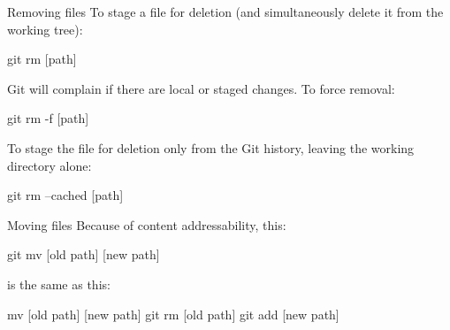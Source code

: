 \begin{frame}[fragile]{Removing files}
  To stage a file for deletion (and simultaneously delete it from the
  working tree):

  \begin{gitCommand}git rm [path]\end{gitCommand}

  Git will complain if there are local or staged changes. To force removal:

  \begin{gitCommand}git rm -f [path]\end{gitCommand}

  To stage the file for deletion only from the Git history, leaving the working directory alone:

  \begin{gitCommand}git rm --cached [path]\end{gitCommand}
\end{frame}

\begin{frame}[fragile]{Moving files}
  Because of content addressability, this:

  \begin{gitCommand}git mv [old path] [new path]\end{gitCommand}

  is the same as this:

  \begin{gitCommand}
mv [old path] [new path]
git rm [old path]
git add [new path]
  \end{gitCommand}

\end{frame}

